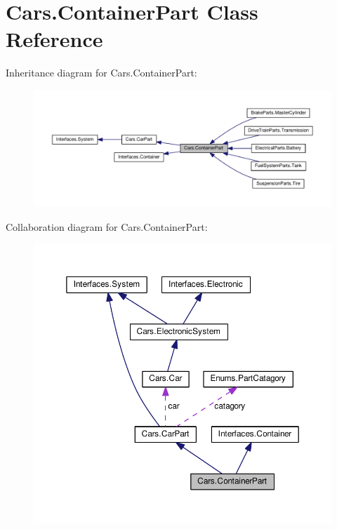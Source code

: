 \hypertarget{classCars_1_1ContainerPart}{}\section{Cars.\+Container\+Part Class Reference}
\label{classCars_1_1ContainerPart}


Inheritance diagram for Cars.\+Container\+Part\+:
\nopagebreak
\begin{figure}[H]
\begin{center}
\leavevmode
\includegraphics[width=350pt]{classCars_1_1ContainerPart__inherit__graph}
\end{center}
\end{figure}


Collaboration diagram for Cars.\+Container\+Part\+:
\nopagebreak
\begin{figure}[H]
\begin{center}
\leavevmode
\includegraphics[width=350pt]{classCars_1_1ContainerPart__coll__graph}
\end{center}
\end{figure}
